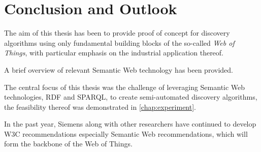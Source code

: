 \begin{comment}
--Summary of main part of text
- Deduction made of basis of main body
- Personal opinion of what has been discussed
- Comment about the future
- implications for future work
- important facts and figures not mentioned in body of work
- summary of main points
- concluding Statements
- recommendations
- predictions
- solutions
\end{comment}

\chapter{Conclusion and Outlook}
The aim of this thesis has been to provide proof of concept for discovery algorithms using only fundamental building blocks of the so-called \textit{Web of Things}, with particular emphasis on the industrial application thereof.

A brief overview of relevant Semantic Web technology has been provided.

The central focus of this thesis was the challenge of leveraging Semantic Web technologies, RDF and SPARQL, to create semi-automated discovery algorithms, the feasibility thereof was demonstrated in \ref{chap:experiment}.

In the past year, Siemens along with other researchers have continued to develop W3C recommendations especially Semantic Web recommendations, which will form the backbone of the Web of Things.

